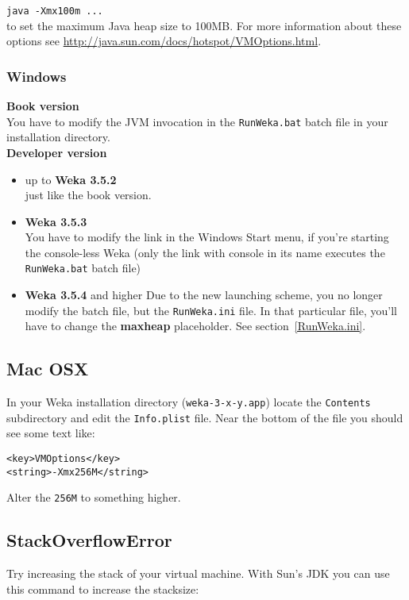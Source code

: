 \verb=java -Xmx100m ...=\\

\noindent to set the maximum Java heap size to 100MB. For more
information about these options see
\url{http://java.sun.com/docs/hotspot/VMOptions.html}{}.

\subsubsection{Windows}

\textbf{Book version}\\
You have to modify the JVM invocation
in the \verb=RunWeka.bat= batch file in your installation directory.\\

\noindent \textbf{Developer version}
\begin{itemize}
\item up to \textbf{Weka 3.5.2}\\
just like the book version.
\item \textbf{Weka 3.5.3}\\
You have to modify the link in the Windows Start menu, if you're starting the console-less Weka (only the link with console in its name executes the \verb=RunWeka.bat= batch file)
\item \textbf{Weka 3.5.4} and higher
Due to the new launching scheme, you no longer modify the batch file, but the \verb=RunWeka.ini= file. In that particular file, you'll have to change the \textbf{maxheap} placeholder. See section~\ref{RunWeka.ini}.
\end{itemize}

\subsection{Mac OSX}
In your Weka installation directory (\verb=weka-3-x-y.app=) locate the \verb=Contents= subdirectory and edit the
\verb=Info.plist= file. Near the bottom of the file you should see some text like:

\begin{verbatim}
<key>VMOptions</key>
<string>-Xmx256M</string>
\end{verbatim}

\noindent Alter the \verb=256M= to something higher.

\subsection{StackOverflowError}
Try increasing the stack of your virtual machine. With Sun's JDK you
can use this command to increase the stacksize:\\

